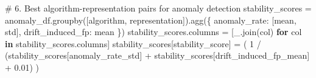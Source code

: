 \documentclass[
  letterpaper,
  DIV=11,
  numbers=noendperiod]{scrartcl}
\newenvironment{Shaded}{\begin{snugshade}}{\end{snugshade}}
\newcommand{\CommentTok}[1]{\textcolor[rgb]{0.37,0.37,0.37}{#1}}
\newcommand{\ControlFlowTok}[1]{\textcolor[rgb]{0.00,0.23,0.31}{\textbf{#1}}}
\newcommand{\DecValTok}[1]{\textcolor[rgb]{0.68,0.00,0.00}{#1}}
\newcommand{\FloatTok}[1]{\textcolor[rgb]{0.68,0.00,0.00}{#1}}
\newcommand{\KeywordTok}[1]{\textcolor[rgb]{0.00,0.23,0.31}{\textbf{#1}}}
\newcommand{\NormalTok}[1]{\textcolor[rgb]{0.00,0.23,0.31}{#1}}
\newcommand{\OperatorTok}[1]{\textcolor[rgb]{0.37,0.37,0.37}{#1}}
\newcommand{\StringTok}[1]{\textcolor[rgb]{0.13,0.47,0.30}{#1}}
\renewenvironment{Shaded}{%
  \begin{tcolorbox}[%
    enhanced,%
    colback=codebg,%
    colframe=codebg,%
    borderline west={3pt}{0pt}{sectionblue},%
    fontupper=\small\ttfamily,%
    boxrule=0pt,%
    arc=0pt,%
    boxsep=5pt,%
    left=2mm,%
    right=2mm,%
    top=2mm,%
    bottom=2mm%
  ]%
}{%
  \end{tcolorbox}%
}
\begin{document}
\begin{Shaded}
\begin{Highlighting}[]
\CommentTok{\# 6. Best algorithm{-}representation pairs for anomaly detection}
\NormalTok{stability\_scores }\OperatorTok{=}\NormalTok{ anomaly\_df.groupby([}\StringTok{\textquotesingle{}algorithm\textquotesingle{}}\NormalTok{, }\StringTok{\textquotesingle{}representation\textquotesingle{}}\NormalTok{]).agg(\{}
    \StringTok{\textquotesingle{}anomaly\_rate\textquotesingle{}}\NormalTok{: [}\StringTok{\textquotesingle{}mean\textquotesingle{}}\NormalTok{, }\StringTok{\textquotesingle{}std\textquotesingle{}}\NormalTok{],}
    \StringTok{\textquotesingle{}drift\_induced\_fp\textquotesingle{}}\NormalTok{: }\StringTok{\textquotesingle{}mean\textquotesingle{}}
\NormalTok{\})}
\NormalTok{stability\_scores.columns }\OperatorTok{=}\NormalTok{ [}\StringTok{\textquotesingle{}\_\textquotesingle{}}\NormalTok{.join(col) }\ControlFlowTok{for}\NormalTok{ col }\KeywordTok{in}\NormalTok{ stability\_scores.columns]}
\NormalTok{stability\_scores[}\StringTok{\textquotesingle{}stability\_score\textquotesingle{}}\NormalTok{] }\OperatorTok{=}\NormalTok{ (}
    \DecValTok{1} \OperatorTok{/}\NormalTok{ (stability\_scores[}\StringTok{\textquotesingle{}anomaly\_rate\_std\textquotesingle{}}\NormalTok{] }\OperatorTok{+}\NormalTok{ stability\_scores[}\StringTok{\textquotesingle{}drift\_induced\_fp\_mean\textquotesingle{}}\NormalTok{] }\OperatorTok{+} \FloatTok{0.01}\NormalTok{)}
\NormalTok{)}


\end{Highlighting}
\end{Shaded}
\end{document}
